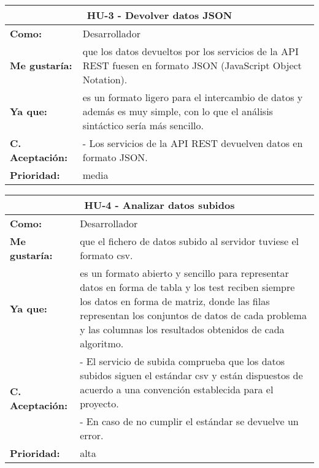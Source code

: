 
\begin{table}[H]
	\begin{tabular}{| p{3cm}| p{11cm} |}
		\hline
		\multicolumn{2}{|c|}{\textbf{HU-3} - Devolver datos JSON} \\ \hline
		\textbf{Como:} & Desarrollador \\ \hline
		\textbf{Me gustaría:} & que los datos devueltos por los servicios de la API REST fuesen en formato JSON (JavaScript Object Notation). \\ \hline
		\textbf{Ya que:} & es un formato ligero para el intercambio de datos y además es muy simple, con lo que el análisis sintáctico sería más sencillo. \\ \hline
		\textbf{C. Aceptación:} & - Los servicios de la API REST devuelven datos en formato JSON. \\ \hline
		\textbf{\textbf{Prioridad:}} & media \\ \hline
	\end{tabular}
\end{table}


\begin{table}[H]
	\begin{tabular}{| p{3cm}| p{11cm} |}
		\hline
		\multicolumn{2}{|c|}{\textbf{HU-4} - Analizar datos subidos} \\ \hline
		\textbf{Como:} & Desarrollador \\ \hline
		\textbf{Me gustaría:} & que el fichero de datos subido al servidor tuviese el formato csv. \\ \hline
		\textbf{Ya que:} & es un formato abierto y sencillo para representar datos en forma de tabla y los test reciben siempre los datos en forma de matriz, donde las filas representan los conjuntos de datos de cada problema y las columnas los resultados obtenidos de cada algoritmo. \\ \hline
		\multirow{2}{11cm}{\textbf{C. Aceptación:}} & - El servicio de subida comprueba que los datos subidos siguen el estándar csv y están dispuestos de acuerdo a una convención establecida para el proyecto. \\
		& - En caso de no cumplir el estándar se devuelve un error. \\ \hline 
		\textbf{\textbf{Prioridad:}} & alta \\ \hline
	\end{tabular}
\end{table}
	
